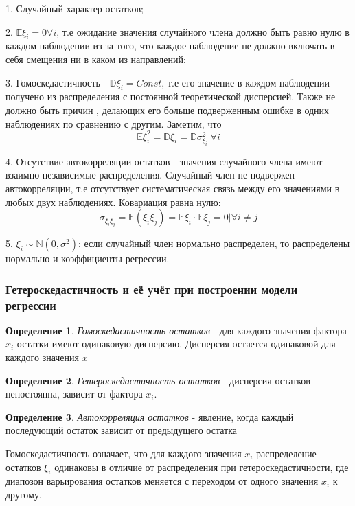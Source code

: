 \documentclass[aps,%
12pt,%
final,%
oneside,
onecolumn,%
musixtex, %
superscriptaddress,%
centertags]{article} %
\theoremstyle{plain}
\theoremstyle{definition}
\newtheorem{definition}{Определение}[subsection]
\theoremstyle{remark}
\begin{document}
1. Случайный характер остатков;

2. $\mathbb{E}\xi_i = 0 \forall i$, т.е ожидание значения случайного члена должно быть равно нулю в каждом наблюдении из-за того, что каждое наблюдение не должно включать в себя смещения ни в каком из направлений;

3. Гомоскедастичность - $\mathbb{D}\xi_i = Const $, т.е его значение в каждом наблюдении получено из распределения с постоянной теоретической дисперсией. Также не должно быть причин , делающих его больше подверженным ошибке в одних наблюдениях по сравнению с другим. Заметим, что $$\mathbb{E}\xi_i^2 = \mathbb{D}\xi_i = \mathbb{D}\sigma_{\xi_i}^2 | \forall i $$

4. Отсутствие автокорреляции остатков - значения случайного члена имеют взаимно независимые распределения. Случайный член не подвержен автокорреляции, т.е отсутствует систематическая связь между его значениями в любых двух наблюдениях.
Ковариация равна нулю:
$$ \sigma_{\xi_{i}\xi_{j}} = \mathbb{E}(\xi_i\xi_j) = \mathbb{E}\xi_i \cdot \mathbb{E}\xi_j = 0 | \forall i \neq j $$

5. $\xi_i \sim \mathbb{N}(0,\sigma^2)$: если случайный член нормально распределен, то распределены нормально и коэффициенты регрессии.

\subsubsection{Гетероскедастичность и её учёт при построении модели регрессии}

\begin{definition}
	\textit{Гомоскедастичность остатков} - для каждого значения фактора $x_i$ остатки имеют одинаковую дисперсию. Дисперсия остается одинаковой для каждого значения $x$
\end{definition}
\begin{definition}
	\textit{Гетероскедастичность остатков} - дисперсия остатков непостоянна, зависит от фактора $x_i$.
\end{definition}
\begin{definition}
	\textit{Автокорреляция остатков}  - явление, когда каждый последующий остаток зависит от предыдущего остатка
\end{definition}

Гомоскедастичность означает, что для каждого значения $x_i$ распределение остатков $\xi_i$ одинаковы в отличие от распределения при гетероскедастичности, где диапозон варьирования остатков меняется с переходом от одного значения $x_i$ к другому.
\end{document}
